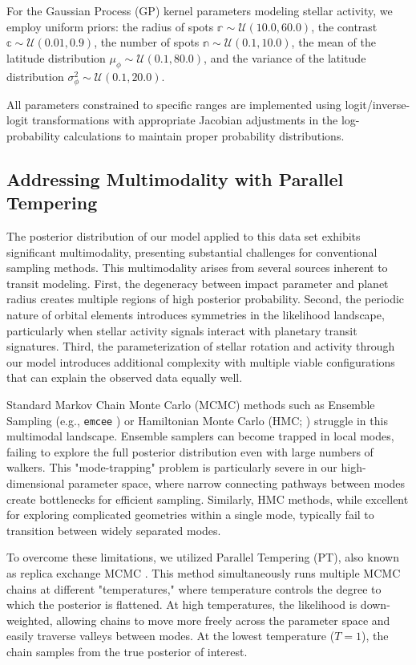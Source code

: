 \documentclass[twocolumn]{aastex631}
\begin{document}
For the Gaussian Process (GP) kernel parameters modeling stellar activity, we employ uniform priors: the radius of spots 
$\mathbb{r} \sim \mathcal{U}(10.0, 60.0)$, the contrast $\mathbb{c} \sim \mathcal{U}(0.01, 0.9)$, 
the number of spots $\mathbb{n} \sim \mathcal{U}(0.1, 10.0)$, the mean of the latitude distribution $\mu_\phi \sim \mathcal{U}(0.1, 80.0)$, 
and the variance of the latitude distribution $\sigma^2_\phi \sim \mathcal{U}(0.1, 20.0)$.

All parameters constrained to specific ranges are implemented using logit/inverse-logit transformations with appropriate 
Jacobian adjustments in the log-probability calculations to maintain proper probability distributions.

\subsection{Addressing Multimodality with Parallel Tempering}

The posterior distribution of our model applied to this data set
exhibits significant multimodality, presenting substantial challenges for
conventional sampling methods. This multimodality arises from several sources
inherent to transit modeling. First, the degeneracy between impact parameter
and planet radius creates multiple regions of high posterior probability.
Second, the periodic nature of orbital elements introduces symmetries in the
likelihood landscape, particularly when stellar activity signals interact with
planetary transit signatures. Third, the parameterization of stellar rotation
and activity through our model introduces additional complexity with multiple
viable configurations that can explain the observed data equally well.

Standard Markov Chain Monte Carlo (MCMC) methods such as Ensemble Sampling
(e.g., \texttt{emcee} \cite{emcee}) or Hamiltonian Monte Carlo (HMC;
\cite{Hoffman2011}) struggle in this multimodal landscape. Ensemble samplers can
become trapped in local modes, failing to explore the full posterior
distribution even with large numbers of walkers. This "mode-trapping" problem is
particularly severe in our high-dimensional parameter space, where narrow
connecting pathways between modes create bottlenecks for efficient sampling.
Similarly, HMC methods, while excellent for exploring complicated geometries
within a single mode, typically fail to transition between widely separated
modes.

To overcome these limitations, we utilized Parallel Tempering (PT), also known
as replica exchange MCMC \citep{Earl_2005,ptemcee}. This method
simultaneously runs multiple MCMC chains at different "temperatures," where
temperature controls the degree to which the posterior is flattened. At high
temperatures, the likelihood is down-weighted, allowing chains to move more
freely across the parameter space and easily traverse valleys between modes. At
the lowest temperature ($T=1$), the chain samples from the true posterior of
interest.
\end{document}
